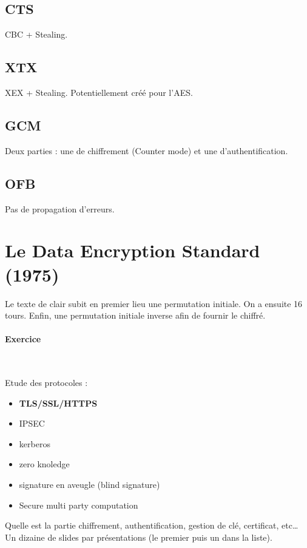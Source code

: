 \subsection{CTS}
CBC + Stealing.
\subsection{XTX}
XEX + Stealing. Potentiellement créé pour l'AES.
\subsection{GCM}
Deux parties : une de chiffrement (Counter mode) et une d'authentification.
\subsection{OFB}
Pas de propagation d'erreurs.

\section{Le Data Encryption Standard (1975)}
Le texte de clair subit en premier lieu une permutation initiale. On a ensuite 16 tours. Enfin, une permutation initiale inverse afin de fournir le chiffré.
\paragraph{Exercice}~\\\par
Etude des protocoles :
\begin{itemize}
 \item \textbf{TLS/SSL/HTTPS}
 \item IPSEC
 \item kerberos
 \item zero knoledge
 \item signature en aveugle (blind signature)
 \item Secure multi party computation
\end{itemize}
Quelle est la partie chiffrement, authentification, gestion de clé, certificat, etc\ldots
Un dizaine de slides par présentations (le premier puis un dans la liste).